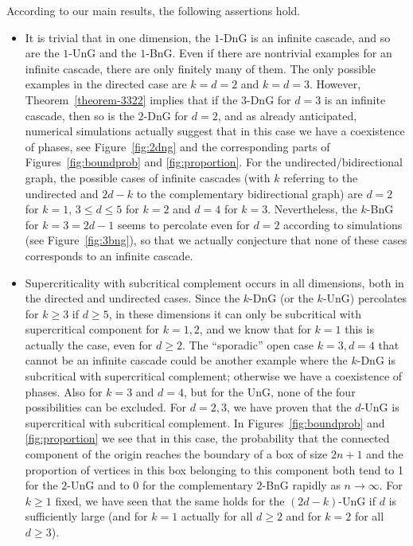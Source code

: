 \documentclass[oneside]{amsart}
\theoremstyle{definition}
\newcommand{\1}{\mathbbm{1}}
\newcommand{\0}{\mathbf{o}}
\numberwithin{equation}{section}
\begin{document}
According to our main results, the following assertions hold.
\begin{itemize}
    \item It is trivial that in one dimension, the $1$-DnG is an infinite cascade, and so are the $1$-UnG and the $1$-BnG. Even if there are nontrivial examples for an infinite cascade, there are only finitely many of them. The only possible examples in the directed case are $k=d=2$ and $k=d=3$. However, Theorem~\ref{theorem-3322}  implies that if the $3$-DnG for $d=3$ is an infinite cascade, then so is the $2$-DnG for $d=2$, and as already anticipated, numerical simulations actually suggest that in this case we have a coexistence of phases, see Figure~\ref{fig:2dng} and the corresponding parts of Figures~\ref{fig:boundprob} and \ref{fig:proportion}. For the undirected/bidirectional graph, the possible cases of infinite cascades (with $k$ referring to the undirected and $2d-k$ to the complementary bidirectional graph) are $d=2$ for $k=1$, $3 \leq d \leq 5$ for $k=2$ and $d=4$ for $k=3$. Nevertheless, the $k$-BnG for $k=3=2d-1$ seems to percolate even for $d=2$ according to simulations (see Figure~\ref{fig:3bng}), so that we actually conjecture that none of these cases corresponds to an infinite cascade.
    \item Supercriticality with subcritical complement occurs in all dimensions, both in the directed and undirected cases. Since the $k$-DnG (or the $k$-UnG) percolates for $k\geq 3$ if $d \geq 5$, in these dimensions it can only be subcritical with supercritical component for $k=1,2$, and we know that for $k=1$ this is actually the case, even for $d \geq 2$. The ``sporadic'' open case $k=3, d=4$ that cannot be an infinite cascade could be another example where the $k$-DnG is subcritical with supercritical complement; otherwise we have a coexistence of phases. Also for $k=3$ and $d=4$, but for the UnG, none of the four possibilities can be excluded. For $d=2,3$, we have proven that the $d$-UnG is supercritical with subcritical complement. In Figures~\ref{fig:boundprob} and \ref{fig:proportion} we see that in this case, the probability that the connected component of the origin reaches the boundary of a box of size $2n+1$ and the proportion of vertices in this box belonging to this component both tend to 1 for the $2$-UnG and to 0 for the complementary $2$-BnG rapidly as $n\to\infty$.  For $k \geq 1$ fixed, we have seen that the same holds for the $(2d-k)$-UnG if $d$ is sufficiently large (and for $k=1$ actually for all $d \geq 2$ and for $k=2$ for all $d \geq 3$). 

\end{itemize}
\end{document}
